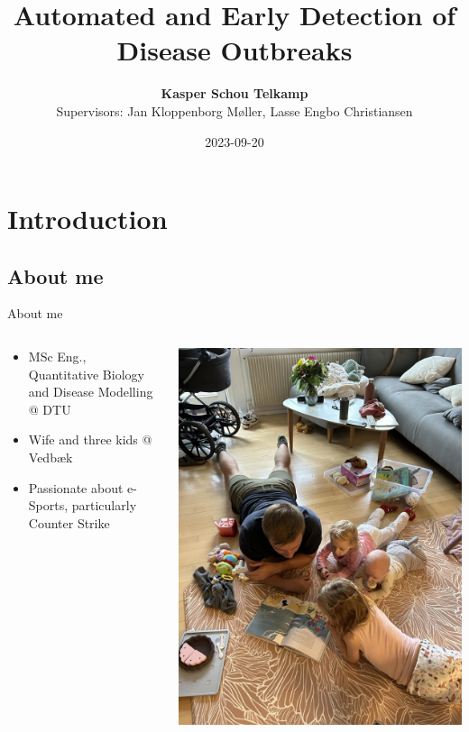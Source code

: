 \documentclass[aspectratio=169]{beamer}
\title[Automated and Early Detection of Disease Outbreaks]{Automated and
Early Detection of Disease Outbreaks}
\author{\textbf{Kasper Schou Telkamp}\\
Supervisors: Jan Kloppenborg Møller, Lasse Engbo Christiansen}
\institute{\strut \\
\strut \\
Master Thesis Project\\
Spring, 2023\\
Technical University of Denmark}
\date{2023-09-20}
\begin{document}
\frame{
	\maketitle
}

\hypertarget{introduction}{%
\section{Introduction}\label{introduction}}

\hypertarget{about-me}{%
\subsection{About me}\label{about-me}}

\begin{frame}{About me}
\begin{columns}
\begin{column}{.48\textwidth}
\begin{itemize}
  \item MSc Eng., Quantitative Biology and Disease Modelling @ DTU
  \item Wife and three kids @ Vedbæk
  \item Passionate about e-Sports, particularly Counter Strike
\end{itemize}
\end{column}
\hfill
\begin{column}{.48\textwidth}

 \tiny


\includegraphics[width=0.75\linewidth]{../figures/family} 

 \normalsize
\end{column}
\end{columns}
\end{frame}
\end{document}
